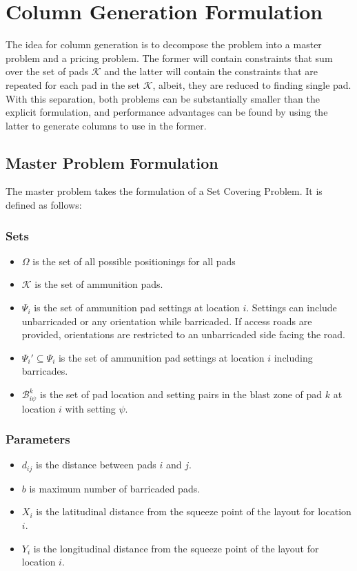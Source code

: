 \documentclass[10pt]{article}
\begin{document}
  	\section{Column Generation Formulation}
  	The idea for column generation is to decompose the problem into a master problem and a pricing problem. The former will contain constraints that sum over the set of pads $ \mathcal{K} $ and the latter will contain the constraints that are repeated for each pad in the set $ \mathcal{K} $, albeit, they are reduced to finding single pad. With this separation, both problems can be substantially smaller than the explicit formulation, and performance advantages can be found by using the latter to generate columns to use in the former.
  
	\subsection{Master Problem Formulation}
	The master problem takes the formulation of a Set Covering Problem. It is defined as follows:
	
	\subsubsection{Sets}
	\begin{itemize}
		\item $\mathcal{\Omega}$ is the set of all possible positionings for all pads
		\item $\mathcal{K}$ is the set of ammunition pads.
		\item $\Psi_i$ is the set of ammunition pad settings at location $ i $. Settings can include unbarricaded or any orientation while barricaded. If access roads are provided, orientations are restricted to an unbarricaded side facing the road.
		\item $\Psi_i' \subseteq \Psi_i$ is the set of ammunition pad settings at location $ i $ including barricades.
		\item $ \mathcal{B}_{i\psi}^{k} $ is the set of pad location and setting pairs in the blast zone of pad $ k $ at location $ i $ with setting $ \psi $. 
	\end{itemize}
	
	\subsubsection{Parameters}
	\begin{itemize}
		\item $d_{ij}$ is the distance between pads $ i $ and $ j $.
		\item $ b $ is maximum number of barricaded pads.
		\item $ X_i $ is the latitudinal distance from the squeeze point of the layout for location $ i $.
		\item $ Y_i $ is the longitudinal distance from the squeeze point of the layout for location $ i $.
	\end{itemize}
	
\end{document}
